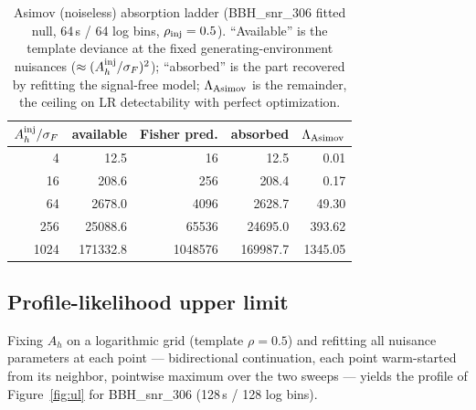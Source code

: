 \documentclass[11pt]{article}
\newcommand{\Ah}{A_h}
\begin{document}
\begin{table}[t]
\centering
\caption{Asimov (noiseless) absorption ladder (BBH\_snr\_306 fitted null, 64\,s / 64 log bins, $\rho_{\rm inj} = 0.5$). ``Available'' is the template deviance at the fixed generating-environment nuisances ($\approx (\Ah^{\rm inj}/\sigma_F)^2$); ``absorbed'' is the part recovered by refitting the signal-free model; $\Lambda_{\rm Asimov}$ is the remainder, the ceiling on LR detectability with perfect optimization.}
\label{tab:asimov}
\begin{tabular}{rrrrr}
\toprule
$\Ah^{\rm inj}/\sigma_F$ & available & Fisher pred. & absorbed & $\Lambda_{\rm Asimov}$ \\
\midrule
4 & 12.5 & 16 & 12.5 & 0.01 \\
16 & 208.6 & 256 & 208.4 & 0.17 \\
64 & 2678.0 & 4096 & 2628.7 & 49.30 \\
256 & 25088.6 & 65536 & 24695.0 & 393.62 \\
1024 & 171332.8 & 1048576 & 169987.7 & 1345.05 \\
\bottomrule
\end{tabular}
\end{table}

\subsection{Profile-likelihood upper limit}
\label{sec:ul}

Fixing $\Ah$ on a logarithmic grid (template $\rho = 0.5$) and refitting all nuisance parameters at each point --- bidirectional continuation, each point warm-started from its neighbor, pointwise maximum over the two sweeps --- yields the profile of Figure~\ref{fig:ul} for BBH\_snr\_306 (128\,s / 128 log bins).
\end{document}

